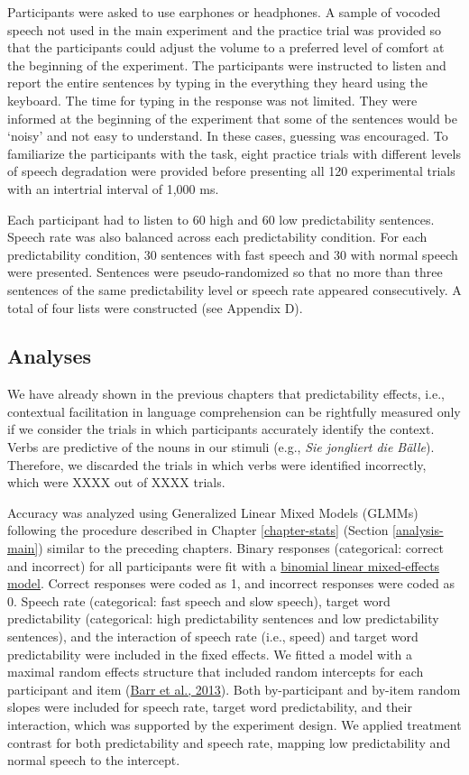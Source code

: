 \documentclass[a4paper, nobind]{templates/ociamthesis}
\begin{document}
Participants were asked to use earphones or headphones.
A sample of vocoded speech not used in the main experiment and the practice trial was provided so that the participants could adjust the volume to a preferred level of comfort at the beginning of the experiment.
The participants were instructed to listen and report the entire sentences by typing in the everything they heard using the keyboard.
The time for typing in the response was not limited.
They were informed at the beginning of the experiment that some of the sentences would be `noisy' and not easy to understand.
In these cases, guessing was encouraged.
To familiarize the participants with the task, eight practice trials with different levels of speech degradation were provided before presenting all 120 experimental trials with an intertrial interval of 1,000 ms.

Each participant had to listen to 60 high and 60 low predictability sentences.
Speech rate was also balanced across each predictability condition.
For each predictability condition, 30 sentences with fast speech and 30 with normal speech were presented.
Sentences were pseudo-randomized so that no more than three sentences of the same predictability level or speech rate appeared consecutively.
A total of four lists were constructed (see Appendix D).

\hypertarget{analyses-3}{%
\subsection{Analyses}\label{analyses-3}}

We have already shown in the previous chapters that predictability effects, i.e., contextual facilitation in language comprehension can be rightfully measured only if we consider the trials in which participants accurately identify the context.
Verbs are predictive of the nouns in our stimuli (e.g., \emph{Sie jongliert die Bälle}).
Therefore, we discarded the trials in which verbs were identified incorrectly, which were XXXX out of XXXX trials.

Accuracy was analyzed using Generalized Linear Mixed Models (GLMMs) following the procedure described in Chapter \ref{chapter-stats} (Section \ref{analysis-main}) similar to the preceding chapters.
Binary responses (categorical: correct and incorrect) for all participants were fit with a \protect\hyperlink{binomial-logistic-mixed-effects-model}{binomial linear mixed-effects model}.
Correct responses were coded as 1, and incorrect responses were coded as 0.
Speech rate (categorical: fast speech and slow speech), target word predictability (categorical: high predictability sentences and low predictability sentences), and the interaction of speech rate (i.e., speed) and target word predictability were included in the fixed effects.
We fitted a model with a maximal random effects structure that included random intercepts for each participant and item (\protect\hyperlink{ref-Barr2013}{Barr et al., 2013}).
Both by-participant and by-item random slopes were included for speech rate, target word predictability, and their interaction,
which was supported by the experiment design.
We applied treatment contrast for both predictability and speech rate, mapping low predictability and normal speech to the intercept.
\end{document}

